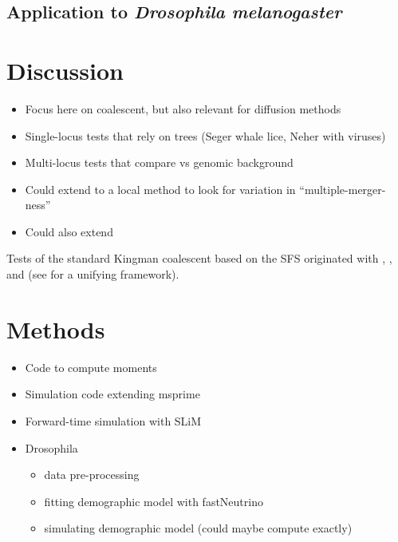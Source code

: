 \documentclass[11pt, letterpaper]{article}   	%
\begin{document}
\subsection*{Application to \textit{Drosophila melanogaster}}

\section*{Discussion}
\begin{itemize}
    \item Focus here on coalescent, but also relevant for diffusion methods
    \item Single-locus tests that rely on trees (Seger whale lice, Neher with viruses)
    \item Multi-locus tests that compare vs genomic background
    \item Could extend to a local method to look for variation in ``multiple-merger-ness''
    \item Could also extend
\end{itemize}

Tests of the standard Kingman coalescent based on the SFS originated with \cite{Tajima1989}, \cite{FuLi1993}, and \cite{SimonsenEtAl1995} (see \cite{Achaz2009} for a unifying framework).

\section*{Methods}
\begin{itemize}
    \item Code to compute moments
    \item Simulation code extending msprime
    \item Forward-time simulation with SLiM
    \item Drosophila
    \begin{itemize}
        \item data pre-processing
        \item fitting demographic model with fastNeutrino
        \item simulating demographic model (could maybe compute exactly)
    \end{itemize}
\end{itemize}

\printbibliography
\end{document}
